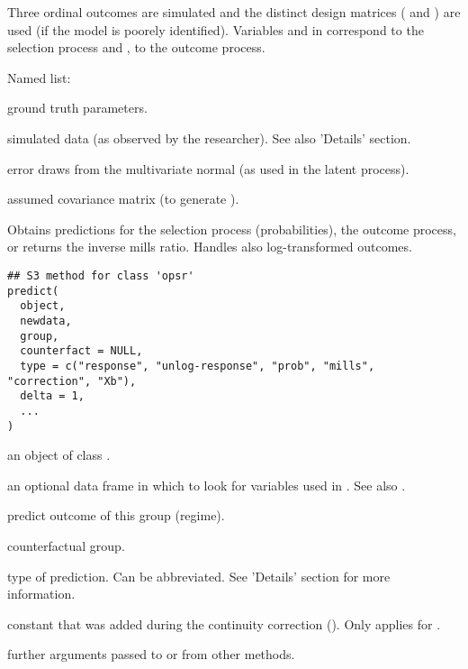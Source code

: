 \documentclass[letterpaper]{book}
\begin{document}
%
\begin{Details}
Three ordinal outcomes are simulated and the distinct design matrices ( and
) are used (if  the model is poorely identified). Variables  and
 in  correspond to the selection process and ,  to the outcome
process.
\end{Details}
%
\begin{Value}
Named list:
\begin{ldescription}
\item[\code{params}] ground truth parameters.
\item[\code{data}] simulated data (as observed by the researcher). See also 'Details' section.
\item[\code{errors}] error draws from the multivariate normal (as used in the latent
process).
\item[\code{sigma}] assumed covariance matrix (to generate ).
\end{ldescription}
\end{Value}
%
\begin{Description}
Obtains predictions for the selection process (probabilities), the outcome process,
or returns the inverse mills ratio. Handles also log-transformed outcomes.
\end{Description}
%
\begin{Usage}
\begin{verbatim}
## S3 method for class 'opsr'
predict(
  object,
  newdata,
  group,
  counterfact = NULL,
  type = c("response", "unlog-response", "prob", "mills", "correction", "Xb"),
  delta = 1,
  ...
)
\end{verbatim}
\end{Usage}
%
\begin{Arguments}
\begin{ldescription}
\item[\code{object}] an object of class .

\item[\code{newdata}] an optional data frame in which to look for variables used in
. See also .

\item[\code{group}] predict outcome of this group (regime).

\item[\code{counterfact}] counterfactual group.

\item[\code{type}] type of prediction. Can be abbreviated. See 'Details' section for
more information.

\item[\code{delta}] constant that was added during the continuity correction
(). Only applies for .

\item[\code{...}] further arguments passed to or from other methods.
\end{ldescription}
\end{Arguments}
\end{document}

